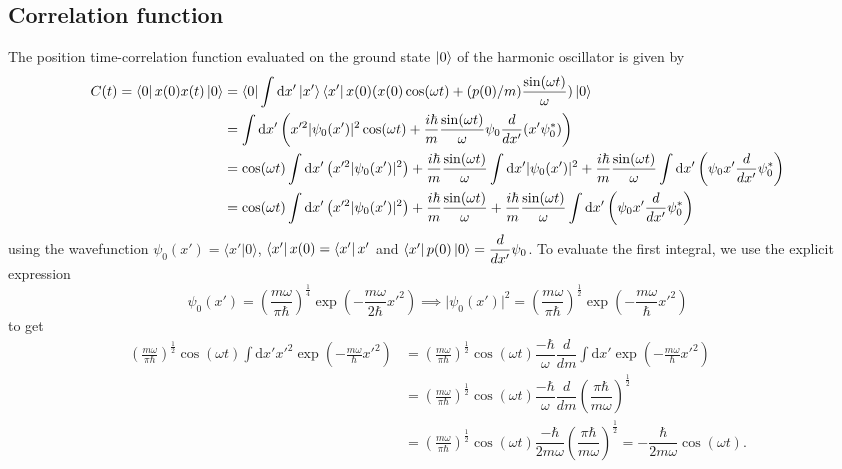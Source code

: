 \documentclass[10pt, a4paper]{article}
\begin{document}
\subsection{Correlation function}
The position time-correlation function evaluated on the ground state $\ket{0}$ of the harmonic oscillator is given by 
\begin{align*}
    C(t) = \bra{0}x(0)x(t)\ket{0} &= \bra{0} \int \text{d}x' \ket{x'}\bra{x'} x(0)(x(0) \cos(\omega t) +  (p(0)/m) \dfrac{\sin(\omega t)}{\omega})\ket{0}\\
    &= \int \text{d}x'  \left(x'^2 \vert\psi_0(x')\vert^2 \cos(\omega t) +  \dfrac{i\hbar}{m} \dfrac{\sin(\omega t)}{\omega} \psi_0 \dfrac{d}{dx'} (x' \psi_0^*) \right) \\
    &= \cos(\omega t) \int \text{d}x'  \left(x'^2 \vert\psi_0(x')\vert^2  \right) + \dfrac{i\hbar}{m} \dfrac{\sin(\omega t)}{\omega} \int \text{d}x'   \vert\psi_0(x')\vert^2 + \dfrac{i \hbar}{m} \dfrac{\sin(\omega t)}{\omega} \int \text{d}x'  \left( \psi_0 x' \dfrac{d}{dx'} \psi_0^*  \right)\\
    &= \cos(\omega t) \int \text{d}x'  \left(x'^2 \vert\psi_0(x')\vert^2  \right) + \dfrac{i\hbar}{m} \dfrac{\sin(\omega t)}{\omega} + \dfrac{i \hbar}{m} \dfrac{\sin(\omega t)}{\omega} \int \text{d}x'  \left( \psi_0 x' \dfrac{d}{dx'} \psi_0^*  \right)
\end{align*}
using the wavefunction $\psi_0(x') = \langle x'\vert 0\rangle $, $\bra{x'} x(0) = \bra{x'} x' $ and $ \bra{x'}p(0)\ket{0} = \dfrac{d}{dx'} \psi_0$. To evaluate the first integral, we use the explicit expression $$
\psi_0(x') = \left(\frac{m \omega}{\pi \hbar}\right)^{\frac{1}{4}} \exp \left(-\frac{m \omega}{2 \hbar} x'^2\right) \implies \vert \psi_0(x')\vert^2 = \left(\frac{m \omega}{\pi \hbar}\right)^{\frac{1}{2}} \exp \left(-\frac{m \omega}{ \hbar} x'^2\right)$$
to get 
\begin{align*}
    \left(\frac{m \omega}{\pi \hbar}\right)^{\frac{1}{2}} \cos(\omega t) \int \text{d}x' x'^2\exp \left(-\frac{m \omega}{ \hbar} x'^2\right) &= \left(\frac{m \omega}{\pi \hbar}\right)^{\frac{1}{2}} \cos(\omega t) \dfrac{-\hbar}{\omega}\dfrac{d}{dm}\int \text{d}x' \exp \left(-\frac{m \omega}{ \hbar} x'^2\right) \\&= \left(\frac{m \omega}{\pi \hbar}\right)^{\frac{1}{2}} \cos(\omega t) \dfrac{-\hbar}{\omega}\dfrac{d}{dm} \left(\dfrac{\pi \hbar}{m \omega}\right)^{\frac12}\\
    &= \left(\frac{m \omega}{\pi \hbar}\right)^{\frac{1}{2}} \cos(\omega t) \dfrac{-\hbar}{2 m\omega}\left(\dfrac{\pi \hbar}{m \omega}\right)^{\frac12} = -\dfrac{\hbar}{2 m\omega}\cos(\omega t). 
\end{align*}
\end{document}
